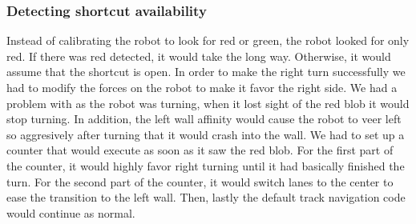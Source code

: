 \documentclass[journal, a4paper]{IEEEtran}
\begin{document}
\subsubsection{Detecting shortcut availability}
Instead of calibrating the robot to look for red or green, the robot looked for only red. If there was red detected, it would take the long way. Otherwise, it would assume that the shortcut is open. In order to make the right turn successfully we had to modify the forces on the robot to make it favor the right side. We had a problem with as the robot was turning, when it lost sight of the red blob it would stop turning. In addition, the left wall affinity would cause the robot to veer left so aggresively after turning that it would crash into the wall. We had to set up a counter that would execute as soon as it saw the red blob. For the first part of the counter, it would highly favor right turning until it had basically finished the turn. For the second part of the counter, it would switch lanes to the center to ease the transition to the left wall. Then, lastly the default track navigation code would continue as normal. 
\end{document}
